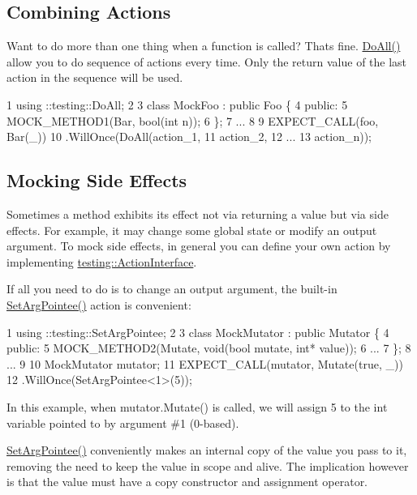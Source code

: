 \subsection*{Combining Actions}

Want to do more than one thing when a function is called? That\textquotesingle{}s fine. {\ttfamily \hyperlink{namespacetesting_a5f533932753d2af95000e96c4a3042e3}{Do\+All()}} allow you to do sequence of actions every time. Only the return value of the last action in the sequence will be used.


\begin{DoxyCode}
1 using ::testing::DoAll;
2 
3 class MockFoo : public Foo \{
4  public:
5   MOCK\_METHOD1(Bar, bool(int n));
6 \};
7 ...
8 
9   EXPECT\_CALL(foo, Bar(\_))
10       .WillOnce(DoAll(action\_1,
11                       action\_2,
12                       ...
13                       action\_n));
\end{DoxyCode}


\subsection*{Mocking Side Effects}

Sometimes a method exhibits its effect not via returning a value but via side effects. For example, it may change some global state or modify an output argument. To mock side effects, in general you can define your own action by implementing {\ttfamily \hyperlink{classtesting_1_1_action_interface}{testing\+::\+Action\+Interface}}.

If all you need to do is to change an output argument, the built-\/in {\ttfamily \hyperlink{namespacetesting_a5740a5033b88c37666fcd09a269d123f}{Set\+Arg\+Pointee()}} action is convenient\+:


\begin{DoxyCode}
1 using ::testing::SetArgPointee;
2 
3 class MockMutator : public Mutator \{
4  public:
5   MOCK\_METHOD2(Mutate, void(bool mutate, int* value));
6   ...
7 \};
8 ...
9 
10   MockMutator mutator;
11   EXPECT\_CALL(mutator, Mutate(true, \_))
12       .WillOnce(SetArgPointee<1>(5));
\end{DoxyCode}


In this example, when {\ttfamily mutator.\+Mutate()} is called, we will assign 5 to the {\ttfamily int} variable pointed to by argument \#1 (0-\/based).

{\ttfamily \hyperlink{namespacetesting_a5740a5033b88c37666fcd09a269d123f}{Set\+Arg\+Pointee()}} conveniently makes an internal copy of the value you pass to it, removing the need to keep the value in scope and alive. The implication however is that the value must have a copy constructor and assignment operator.

